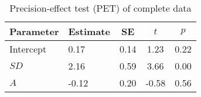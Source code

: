 \begin{table}[ht]
\centering
\caption{Precision-effect test (PET) of complete data} 
\label{tab:PET}
\begingroup\small
\begin{tabular}{llccc}
  \hline
Parameter & Estimate & SE & $t$ & $p$ \\ 
  \hline
Intercept & 0.17 & 0.14 & 1.23 & 0.22 \\ 
  $SD$ & 2.16 & 0.59 & 3.66 & 0.00 \\ 
  $A$ & -0.12 & 0.20 & -0.58 & 0.56 \\ 
   \hline
\end{tabular}
\endgroup
\end{table}
